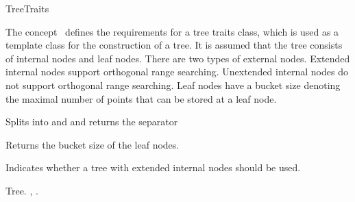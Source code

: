 

\begin{ccRefConcept}{TreeTraits}

\ccDefinition
  
The concept \ccRefName\ defines the requirements for a tree traits class, which is used as
a template class for the construction of a tree. 
It is assumed that the tree consists of internal nodes
and leaf nodes. There are two types of external nodes. Extended internal nodes support orthogonal range searching.
Unextended internal nodes do not support orthogonal range searching.
Leaf nodes have a bucket size denoting the maximal number of points that can be 
stored at a leaf node.

\ccTypes


\ccCreation
{}  %

\ccOperations

{Splits  into  and  and returns the separator}

 {Returns the bucket size of the leaf nodes.}

 {Indicates whether a tree with extended internal nodes should be used.}
 
\ccHasModels


\ccSeeAlso

Tree.
,
.

\end{ccRefConcept}



